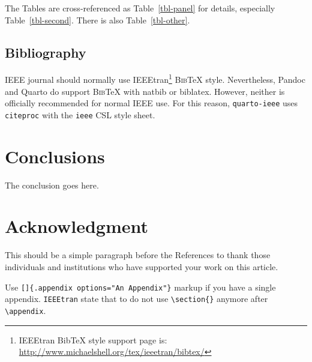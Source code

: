 \documentclass[
  twoside,
  web,
            journal,
    ]{ieeecolor}
\theoremstyle{plain}
\theoremstyle{remark}
\begin{document}
The Tables are cross-referenced as Table~\ref{tbl-panel} for details,
especially Table~\ref{tbl-second}. There is also Table~\ref{tbl-other}.

\begin{table}

\caption{\label{tbl-other}A table}


\end{table}%

\subsection{Bibliography}\label{bibliography}

IEEE journal should normally use IEEEtran\footnote{IEEEtran BibTeX style
  support page is:
  \url{http://www.michaelshell.org/tex/ieeetran/bibtex/}}
\textsc{Bib}{\TeX} style. Nevertheless, Pandoc and Quarto do support
\textsc{Bib}{\TeX} with natbib or biblatex. However, neither is
officially recommended for normal IEEE use. For this reason,
\texttt{quarto-ieee} uses \texttt{citeproc} with the \texttt{ieee} CSL
style sheet.

\section{Conclusions}\label{conclusions}

The conclusion goes here.

\section*{Acknowledgment}\label{acknowledgment}

This should be a simple paragraph before the References to thank those
individuals and institutions who have supported your work on this
article.

\appendix[An Appendix]{}

Use \texttt{{[}{]}\{.appendix\ options="An\ Appendix"\}} markup if you
have a single appendix. \texttt{IEEEtran} state that to do not use
\texttt{\textbackslash{}section\{\}} anymore after
\texttt{\textbackslash{}appendix}.
\end{document}
